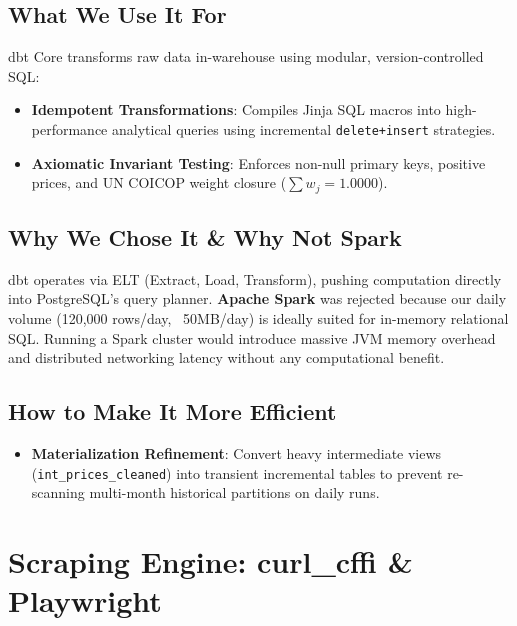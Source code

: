 \documentclass[a4paper, 11pt]{article}
\begin{document}
\subsection{What We Use It For}
dbt Core transforms raw data in-warehouse using modular, version-controlled SQL:
\begin{itemize}[leftmargin=*]
    \item \textbf{Idempotent Transformations}: Compiles Jinja SQL macros into high-performance analytical queries using incremental \texttt{delete+insert} strategies.
    \item \textbf{Axiomatic Invariant Testing}: Enforces non-null primary keys, positive prices, and UN COICOP weight closure ($\sum w_j = 1.0000$).
\end{itemize}

\subsection{Why We Chose It \& Why Not Spark}
dbt operates via ELT (Extract, Load, Transform), pushing computation directly into PostgreSQL's query planner. \textbf{Apache Spark} was rejected because our daily volume (120,000 rows/day, ~50MB/day) is ideally suited for in-memory relational SQL. Running a Spark cluster would introduce massive JVM memory overhead and distributed networking latency without any computational benefit.

\subsection{How to Make It More Efficient}
\begin{itemize}[leftmargin=*]
    \item \textbf{Materialization Refinement}: Convert heavy intermediate views (\texttt{int\_prices\_cleaned}) into transient incremental tables to prevent re-scanning multi-month historical partitions on daily runs.
\end{itemize}

\newpage
\section{Scraping Engine: curl\_cffi \& Playwright}
\end{document}
